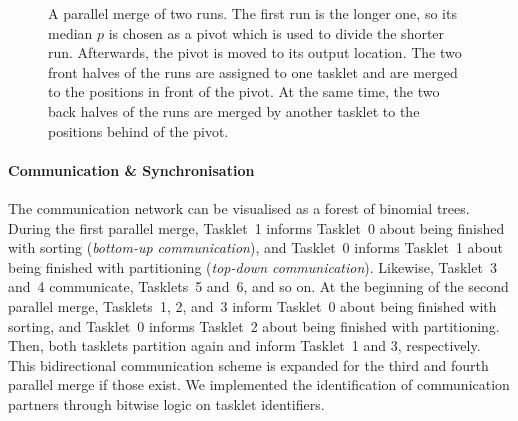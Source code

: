 \begin{figure}

	\caption{
		A parallel merge of two runs.
		The first run is the longer one, so its median \(p\) is chosen as a pivot which is used to divide the shorter run.
		Afterwards, the pivot is moved to its output location.
		The two front halves of the runs are assigned to one tasklet and are merged to the positions in front of the pivot.
		At the same time, the two back halves of the runs are merged by another tasklet to the positions behind of the pivot.
		\cite[Figure~27.6]{cormen2013algorithmen}
	}
	\label{fig:par:merge}
\end{figure}


\paragraph{Communication \& Synchronisation}
The communication network can be visualised as a forest of binomial trees.
During the first parallel merge, Tasklet~1 informs Tasklet~0 about being finished with sorting (\emph{bottom-up communication}), and Tasklet~0 informs Tasklet~1 about being finished with partitioning (\emph{top-down communication}).
Likewise, Tasklet~3 and~4 communicate, Tasklets~5 and~6, and so on.
At the beginning of the second parallel merge, Tasklets~1, 2, and~3 inform Tasklet~0 about being finished with sorting, and Tasklet~0 informs Tasklet~2 about being finished with partitioning.
Then, both tasklets partition again and inform Tasklet~1 and 3, respectively.
This bidirectional communication scheme is expanded for the third and fourth parallel merge if those exist.
We implemented the identification of communication partners through bitwise logic on tasklet identifiers.

